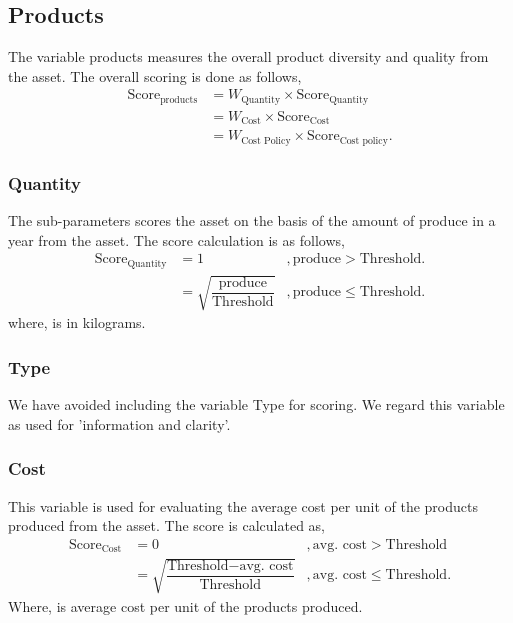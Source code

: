 \documentclass[oneside,twocolumn]{article}
\newcommand{\tsub}[2]{\text{#1}_{\text{#2}}}
\begin{document}
\subsection{Products}
The variable products measures the overall product diversity and quality from the asset.
The overall scoring is done as follows,
\begin{align*}
  \text{Score}_{\text{products}} &= W_{\text{Quantity}} \times \text{Score}_{\text{Quantity}} \\
  &= W_{\text{Cost}} \times \text{Score}_{\text{Cost}} \\
  &= W_{\text{Cost Policy}} \times \text{Score}_{\text{Cost policy}}.
\end{align*}

\subsubsection{Quantity}
The sub-parameters scores the asset on the basis of the amount of produce in a year from the asset. The score calculation is as follows,
\begin{align*}
  \tsub{Score}{Quantity} &= 1 &, \text{produce} > \text{Threshold}. \\
  &= \sqrt{\dfrac{\text{produce}}{\text{Threshold}}} &, \text{produce} \le \text{Threshold}.
\end{align*}
where,  is in kilograms.

\subsubsection{Type}
We have avoided including the variable Type for scoring. We regard this variable as used for 'information and clarity'.

\subsubsection{Cost}
This variable is used for evaluating the average cost per unit of the products produced from the asset. The score is calculated as,
\begin{align*}
  \text{Score}_{\text{Cost}} &= 0 &, \text{avg. cost} > \text{Threshold} \\
  &= \sqrt{\dfrac{\text{Threshold} - \text{avg. cost}}{\text{Threshold}}} &, \text{avg. cost} \le \text{Threshold}.
\end{align*}
Where,  is average cost per unit of the products produced.
\end{document}
